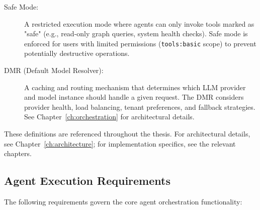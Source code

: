 \documentclass[a4paper,twoside]{sapthesis}
\begin{document}
\begin{description}
    \item[Safe Mode:] A restricted execution mode where agents can only invoke tools marked as "safe" (e.g., read-only graph queries, system health checks). Safe mode is enforced for users with limited permissions (\texttt{tools:basic} scope) to prevent potentially destructive operations.
    
    \item[DMR (Default Model Resolver):] A caching and routing mechanism that determines which LLM provider and model instance should handle a given request. The DMR considers provider health, load balancing, tenant preferences, and fallback strategies. See Chapter~\ref{ch:orchestration} for architectural details.
\end{description}

These definitions are referenced throughout the thesis. For architectural details, see Chapter~\ref{ch:architecture}; for implementation specifics, see the relevant chapters.

\subsection{Agent Execution Requirements}
\label{subsec:fr-agent-execution}

The following requirements govern the core agent orchestration functionality:
\end{document}
